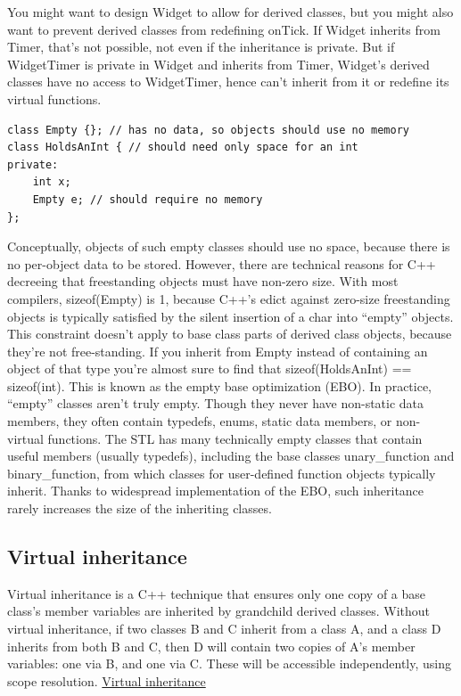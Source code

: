\documentclass[a4paper,12pt,notitlepage]{article}
\begin{document}
You might want to design Widget to allow for derived classes, but you might also want to prevent derived classes from redefining onTick. If Widget inherits from Timer, that's not possible, not even if the inheritance is private. But if WidgetTimer is private in Widget and inherits from Timer, Widget's
derived classes have no access to WidgetTimer, hence can't inherit from it or redefine its virtual functions.

\begin{verbatim}
class Empty {}; // has no data, so objects should use no memory
class HoldsAnInt { // should need only space for an int
private:
    int x;
    Empty e; // should require no memory
};
\end{verbatim}

Conceptually, objects of such empty classes should use no space, because there is no per-object data to be stored. However, there are technical reasons for C++ decreeing that freestanding objects must have non-zero size. With most compilers, sizeof(Empty) is 1, because C++'s edict against zero-size freestanding objects is typically satisfied by the silent insertion of a char into “empty” objects. This constraint doesn't apply
to base class parts of derived class objects, because they're not free-standing. If you inherit from Empty instead of containing an object of that type you're almost sure to find that sizeof(HoldsAnInt) == sizeof(int). This is known as the empty base optimization (EBO). In practice, “empty” classes aren't truly empty. Though they never have non-static data members, they often contain typedefs, enums, static data members, or non-virtual functions. The STL has many technically empty classes that contain useful members (usually typedefs), including the base classes unary\_function and binary\_function, from which classes for user-defined function objects typically inherit. Thanks to widespread implementation of the EBO, such inheritance rarely increases the size of the inheriting classes.


\subsection{Virtual inheritance}

Virtual inheritance is a C++ technique that ensures only one copy of a base class's member variables are inherited by grandchild derived classes. Without virtual inheritance, if two classes B and C inherit from a class A, and a class D inherits from both B and C, then D will contain two copies of A's member variables: one via B, and one via C. These will be accessible independently, using scope resolution.
\href{https://en.wikipedia.org/wiki/Virtual\_inheritance}{Virtual inheritance}
\end{document}
